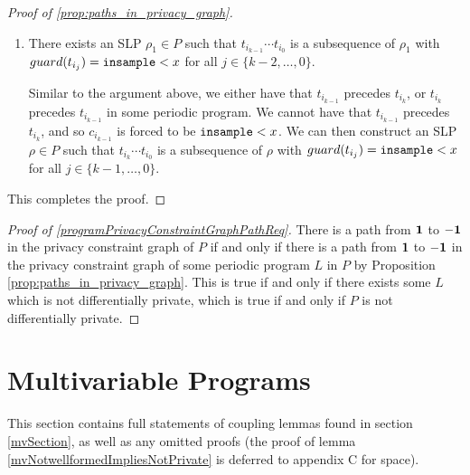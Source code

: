 \begin{proof}[Proof of \ref{prop:paths_in_privacy_graph}]
\begin{itemize}
\begin{enumerate}
            \item There exists an SLP $\rho_1 \in P$ such that $t_{i_{k - 1}} \cdots t_{i_0}$ is a subsequence of $\rho_1$ with $guard(t_{i_j}) = \texttt{insample} < x$ for all $j \in \{k - 2, \dots, 0\}$.
            
            Similar to the argument above, we either have that $t_{i_{k - 1}}$ precedes $t_{i_k}$, or $t_{i_k}$ precedes $t_{i_{k - 1}}$ in some periodic program. We cannot have that $t_{i_{k - 1}}$ precedes $t_{i_k}$, and so $c_{i_{k - 1}}$ is forced to be $\texttt{insample} < x$. We can then construct an SLP $\rho \in P$ such that $t_{i_k} \cdots t_{i_0}$ is a subsequence of $\rho$ with $guard(t_{i_j}) = \texttt{insample} < x$ for all $j \in \{k - 1, \dots, 0\}$. 
        \end{enumerate}
    \end{itemize}

    This completes the proof. 
\end{proof}

\begin{proof}[Proof of \ref{programPrivacyConstraintGraphPathReq}]
    There is a path from $\bf 1$ to $\bf -1$ in the privacy constraint graph of $P$ if and only if there is a path from $\bf 1$ to $\bf -1$ in the privacy constraint graph of some periodic program $L$ in $P$ by Proposition \ref{prop:paths_in_privacy_graph}. This is true if and only if there exists some $L$ which is not differentially private, which is true if and only if $P$ is not differentially private.
\end{proof}

\section{Multivariable Programs}

This section contains full statements of coupling lemmas found in section \ref{mvSection}, as well as any omitted proofs (the proof of lemma \ref{mvNotwellformedImpliesNotPrivate} is deferred to appendix C for space). 


